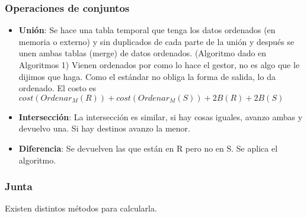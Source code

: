 \subsubsection*{Operaciones de conjuntos}

\begin{itemize}
\item \textbf{Unión}: Se hace una tabla temporal que tenga los datos ordenados (en memoria o externo) y sin duplicados de cada parte de la unión y después se unen ambas tablas (merge) de datos ordenados. (Algoritmo dado en Algoritmos 1) Vienen ordenados por como lo hace el gestor, no es algo que le dijimos que haga. Como el estándar no obliga la forma de salida, lo da ordenado. El costo es $cost(Ordenar_M(R)) + cost(Ordenar_M(S)) + 2 B(R) + 2 B(S) $
\item \textbf{Intersección}: La intersección es similar, si hay cosas iguales, avanzo ambas y devuelvo una. Si hay destinos avanzo la menor.
\item \textbf{Diferencia}: Se devuelven las que están en R pero no en S. Se aplica el algoritmo.
\end{itemize}

\subsubsection*{Junta}
Existen distintos métodos para calcularla.

